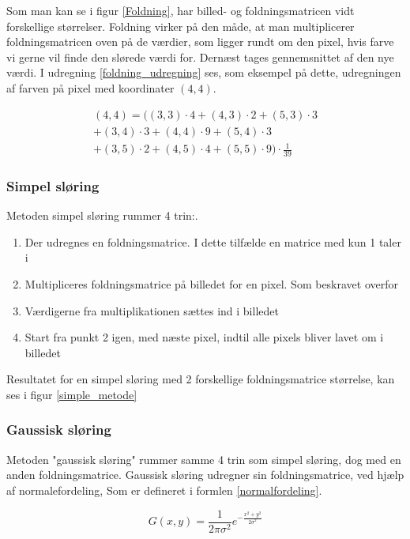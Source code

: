 {Som man kan se i figur \ref{Foldning}, har billed- og foldningsmatricen
vidt forskellige størrelser. Foldning virker på den måde, at man
multiplicerer foldningsmatricen oven på de værdier, som ligger rundt om den pixel,
hvis farve vi gerne vil finde den slørede værdi for. Dernæst tages gennemsnittet af den
nye værdi. I udregning \ref{foldning_udregning} ses, som eksempel på
dette, udregningen af farven på pixel med koordinater $(4,4)$.

\begin{multline}
    (4,4) = ((3,3)\cdot 4+(4,3) \cdot 2+(5,3) \cdot 3\\
    + (3,4) \cdot 3+(4,4) \cdot 9+(5,4) \cdot 3\\
    + (3,5) \cdot 2+(4,5) \cdot 4+(5,5) \cdot 9) \cdot \frac{1}{39}
    \label{foldning_udregning}
\end{multline}

\subsubsection{Simpel sløring}
Metoden simpel sløring rummer 4 trin:.
\begin{enumerate}
	\item{Der udregnes en foldningsmatrice. I dette tilfælde en matrice med kun 1 taler i}
	\item{Multipliceres foldningsmatrice på billedet for en pixel. Som beskravet overfor}
	\item{Værdigerne fra multiplikationen sættes ind i billedet}
	\item{Start fra punkt 2 igen, med næste pixel, indtil alle pixels bliver lavet om i billedet}
\end{enumerate}
Resultatet for en simpel sløring med 2 forskellige foldningsmatrice størrelse, kan ses i figur \ref{simple_metode}

\subsubsection{Gaussisk sløring}
Metoden "gaussisk sløring" rummer samme 4 trin som simpel sløring, dog
med en anden foldningsmatrice. Gaussisk sløring udregner sin
foldningsmatrice, ved hjælp af normalefordeling, Som er defineret i
formlen \ref{normalfordeling}.

\begin{equation}
	G(x,y) = \frac{1}{2\pi\sigma^2}e^{-\frac{x^2+y^2}{2\sigma^2}}
	\label{normalfordeling}
\end{equation}

}
